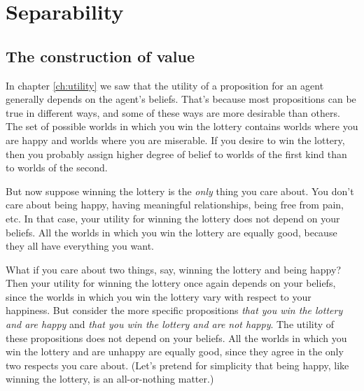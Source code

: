 \chapter{Separability}\label{ch:separability}


\section{The construction of value}\label{sec:construction-value}


In chapter \ref{ch:utility} we saw that the utility of a proposition
for an agent generally depends on the agent's beliefs. That's because
most propositions can be true in different ways, and some of these
ways are more desirable than others. The set of possible worlds in
which you win the lottery contains worlds where you are happy and
worlds where you are miserable. If you desire to win the lottery, then
you probably assign higher degree of belief to worlds of the first
kind than to worlds of the second.

But now suppose winning the lottery is the \emph{only} thing you care
about. You don't care about being happy, having meaningful
relationships, being free from pain, etc. In that case, your utility
for winning the lottery does not depend on your beliefs. All the
worlds in which you win the lottery are equally good, because they all
have everything you want.

What if you care about two things, say, winning the lottery and being
happy? Then your utility for winning the lottery once again depends on
your beliefs, since the worlds in which you win the lottery vary with
respect to your happiness. But consider the more specific propositions
\emph{that you win the lottery and are happy} and \emph{that you win
  the lottery and are not happy}. The utility of these propositions
does not depend on your beliefs. All the worlds in which you win the
lottery and are unhappy are equally good, since they agree in the only
two respects you care about. (Let's pretend for simplicity that being
happy, like winning the lottery, is an all-or-nothing matter.)

